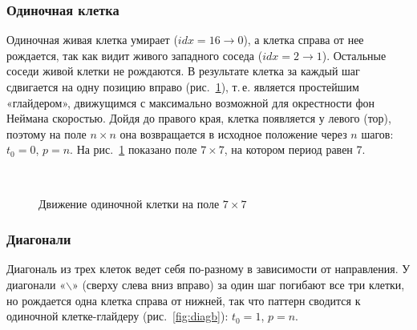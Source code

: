 \documentclass[a4paper,14pt]{extarticle}
\newcommand{\consolesmall}{\fontsize{7}{7.35}\selectfont\ttfamily}
\newcommand{\console}[2][\consolesmall]{}
\begin{document}
\subsubsection*{Одиночная клетка}

Одиночная живая клетка умирает ($idx = 16 \to 0$), а клетка справа от нее рождается, так как видит живого западного соседа ($idx = 2 \to 1$). Остальные соседи живой клетки не рождаются. В результате клетка за каждый шаг сдвигается на одну позицию вправо (рис.~\ref{fig:single}), т.\,е. является простейшим «глайдером», движущимся с максимально возможной для окрестности фон Неймана скоростью. Дойдя до правого края, клетка появляется у левого (тор), поэтому на поле $n \times n$ она возвращается в исходное положение через $n$ шагов: $t_0 = 0$, $p = n$. На рис.~\ref{fig:single} показано поле $7 \times 7$, на котором период равен 7.

\begin{figure}[H]
	\centering
	\begin{minipage}{0.3\textwidth}\centering\console{single_0}\end{minipage}
	\begin{minipage}{0.3\textwidth}\centering\console{single_1}\end{minipage}
	\begin{minipage}{0.3\textwidth}\centering\console{single_2}\end{minipage}\\[3mm]
	\begin{minipage}{0.24\textwidth}\centering\console{single_3}\end{minipage}
	\begin{minipage}{0.24\textwidth}\centering\console{single_4}\end{minipage}
	\begin{minipage}{0.48\textwidth}\centering\console{single_7}\end{minipage}
	\caption{Движение одиночной клетки на поле $7 \times 7$}
	\label{fig:single}
\end{figure}

\subsubsection*{Диагонали}

Диагональ из трех клеток ведет себя по-разному в зависимости от направления. У диагонали «$\backslash$» (сверху слева вниз вправо) за один шаг погибают все три клетки, но рождается одна клетка справа от нижней, так что паттерн сводится к одиночной клетке-глайдеру (рис.~\ref{fig:diagb}): $t_0 = 1$, $p = n$.
\end{document}
